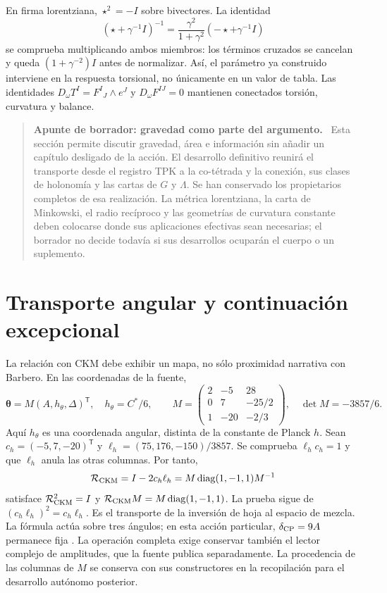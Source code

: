 \documentclass[11pt,a4paper]{article}
\numberwithin{equation}{section}
\theoremstyle{definition}
\newenvironment{apunte}[1]{\par\Needspace{6\baselineskip}\smallskip
\begin{quote}\small\raggedright\color{ink}\noindent\textbf{Apunte de borrador: #1.}\ }
{\end{quote}\smallskip}
\begin{document}
En firma lorentziana, $\star^2=-I$ sobre bivectores. La identidad
\[
(\star+\gamma^{-1}I)^{-1}
=\frac{\gamma^2}{1+\gamma^2}(-\star+\gamma^{-1}I)
\]
se comprueba multiplicando ambos miembros: los términos cruzados se
cancelan y queda $(1+\gamma^{-2})I$ antes de normalizar.
Así, el parámetro ya construido interviene en la respuesta torsional,
no únicamente en un valor de tabla.
Las identidades
$D_\omega T^I=F^I{}_J\wedge e^J$ y $D_\omega F^{IJ}=0$
mantienen conectados torsión, curvatura y balance.

\begin{apunte}{gravedad como parte del argumento}
Esta sección permite discutir gravedad, área e información sin añadir
un capítulo desligado de la acción. El desarrollo definitivo reunirá
el transporte desde el registro TPK a la co-tétrada y la conexión,
sus clases de holonomía y las cartas de $G$ y $\Lambda$.
Se han conservado los propietarios completos de esa realización.
La métrica lorentziana, la carta de Minkowski, el radio recíproco y
las geometrías de curvatura constante deben colocarse donde sus
aplicaciones efectivas sean necesarias; el borrador no decide
todavía si sus desarrollos ocuparán el cuerpo o un suplemento.
\end{apunte}

\section{Transporte angular y continuación excepcional}
\label{sec:cp}
\label{sec:extension}
La relación con CKM debe exhibir un mapa, no sólo proximidad narrativa
con Barbero. En las coordenadas de la fuente,
\[
\symbf\theta=M(A,h_\theta,\Delta)^{\mathsf T},\quad h_\theta=C^*/6,
\qquad
M=\begin{pmatrix}
2&-5&28\\0&7&-25/2\\1&-20&-2/3
\end{pmatrix},
\quad \det M=-3857/6.
\]
Aquí $h_\theta$ es una coordenada angular, distinta de la constante de Planck $h$.
Sean $c_h=(-5,7,-20)^{\mathsf T}$ y
$\ell_h=(75,176,-150)/3857$. Se comprueba
$\ell_hc_h=1$ y que $\ell_h$ anula las otras columnas. Por tanto,
\[
\mathcal R_{\rm CKM}=I-2c_h\ell_h
=M\operatorname{diag}(1,-1,1)M^{-1}
\]
satisface $\mathcal R_{\rm CKM}^2=I$ y
$\mathcal R_{\rm CKM}M=M\operatorname{diag}(1,-1,1)$.
La prueba sigue de $(c_h\ell_h)^2=c_h\ell_h$.
Es el transporte de la inversión de hoja al espacio de mezcla.
La fórmula actúa sobre tres ángulos; en esta acción particular,
$\delta_{\rm CP}=9A$ permanece fija \cite{ckm}.
La operación completa exige conservar también el lector complejo de
amplitudes, que la fuente publica separadamente.
La procedencia de las columnas de $M$ se conserva con sus constructores
en la recopilación para el desarrollo autónomo posterior.
\end{document}
